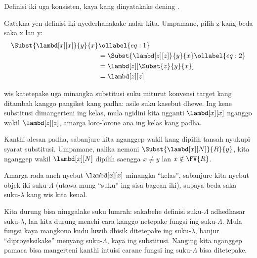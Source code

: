 \documentclass[../../../include/open-logic-section]{subfiles}
\begin{document}
Definisi iki uga konsisten,
kaya kang dinyatakake dening
.

Gatekna yen definisi iki
nyederhanakake nalar kita.
Umpamane, pilih z kang beda saka x lan y:
\begin{align}
  \Subst{\lambd[x][x]}{y}{x} & \ollabel{eq:1}\\
  &= \Subst{\lambd[z][z]}{y}{x} \ollabel{eq:2}\\
  &= \lambd[z][\Subst{z}{y}{x}] \\
  &= \lambd[z][z]
\end{align}

 wis katetepake
uga minangka substitusi suku
miturut konvensi target kang ditambah kanggo pangiket kang padha:
asile suku kasebut dhewe.
Ing kene substitusi dimangerteni
ing kelas, mula 
ngidini kita ngganti
$\lambd[x][x]$ nganggo wakil
$\lambd[z][z]$, amarga
loro-lorone ana ing kelas kang padha.

Kanthi alesan padha,
sabanjure kita nganggep wakil
kang dipilih tansah nyukupi
syarat substitusi. Umpamane,
nalika nemoni
$\Subst{\lambd[x][N]}{R}{y}$,
kita nganggep wakil
$\lambd[x][N]$ dipilih
saengga $x \neq y$
lan $x \notin \FV{R}$.

Amarga rada aneh nyebut
$\lambd[x][x]$ minangka
``kelas'', sabanjure kita
nyebut objek iki
suku-$\Lambda$
(utawa mung ``suku'' ing sisa
bagean iki), supaya beda
saka suku-$\lambda$ kang
wis kita kenal.

\begin{editorial}
  Kita durung bisa ninggalake
  suku lumrah: sakabehe definisi
  suku-$\Lambda$ adhedhasar
  suku-$\lambda$, lan kita durung
  menehi cara kanggo netepake
  fungsi ing suku-$\Lambda$.
  Mula fungsi kaya mangkono
  kudu luwih dhisik ditetepake
  ing suku-$\lambda$, banjur
  ``diproyeksikake'' menyang
  suku-$\Lambda$, kaya ing substitusi.
  Nanging kita nganggep pamaca
  bisa mangerteni kanthi intuisi
  carane fungsi ing suku-$\Lambda$
  bisa ditetepake.
\end{editorial}
\end{document}
